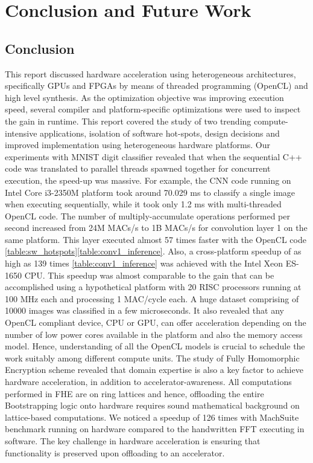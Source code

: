 \chapter{Conclusion and Future Work}
\label{ch5_conclusion}
\section{Conclusion}
\label{6_1}
This report discussed hardware acceleration using heterogeneous architectures, specifically GPUs and FPGAs by means of threaded programming (OpenCL) and high level synthesis. As the optimization objective was improving execution speed, several compiler and platform-specific optimizations were used to inspect the gain in runtime. This report covered the study of two trending compute-intensive applications, isolation of software hot-spots, design decisions and improved implementation using heterogeneous hardware platforms. \newline \newline Our experiments with MNIST digit classifier revealed that when the sequential C++ code was translated to parallel threads spawned together for concurrent execution, the speed-up was massive. For example, the CNN code running on Intel Core i3-2350M platform took around 70.029 ms to classify a single image when executing sequentially, while it took only 1.2 ms with multi-threaded OpenCL code. The number of multiply-accumulate operations performed per second increased from 24M MACs/s to 1B MACs/s for convolution layer 1 on the same platform. This layer executed almost 57 times faster with the OpenCL code \ref{table:sw_hotspots}\ref{table:conv1_inference}. Also, a cross-platform speedup of as high as 139 times \ref{table:conv1_inference} was achieved with the Intel Xeon ES-1650 CPU. This speedup was almost comparable to the gain that can be accomplished using a hypothetical platform with 20 RISC processors running at 100 MHz each and processing 1 MAC/cycle each. A huge dataset comprising of 10000 images was classified in a few microseconds. It also revealed that any OpenCL compliant device, CPU or GPU, can offer acceleration depending on the number of low power cores available in the platform and also the memory access model. Hence, understanding of all the OpenCL models is crucial to schedule the work suitably among different compute units. The study of Fully Homomorphic Encryption scheme revealed that domain expertise is also a key factor to achieve hardware acceleration, in addition to accelerator-awareness. All computations performed in FHE are on ring lattices and hence, offloading the entire Bootstrapping logic onto hardware requires sound mathematical background on lattice-based computations. We noticed a speedup of 126 times with MachSuite benchmark running on hardware compared to the handwritten FFT executing in software. The key challenge in hardware acceleration is ensuring that functionality is preserved upon offloading to an accelerator. 

